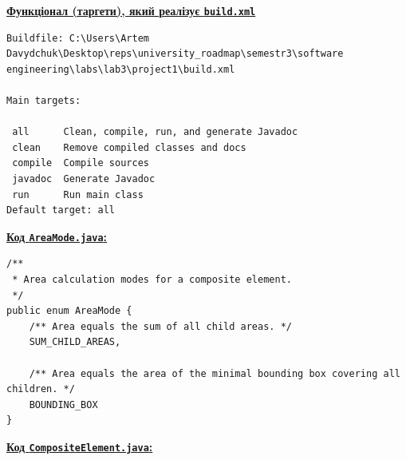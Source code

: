 \documentclass[12pt,a4paper]{article}
\begin{document}
    \textbf{\underline{Функціонал (таргети), який реалізує \texttt{build.xml}}}

    \begin{verbatim}
Buildfile: C:\Users\Artem Davydchuk\Desktop\reps\university_roadmap\semestr3\software engineering\labs\lab3\project1\build.xml

Main targets:

 all      Clean, compile, run, and generate Javadoc
 clean    Remove compiled classes and docs
 compile  Compile sources
 javadoc  Generate Javadoc
 run      Run main class
Default target: all
    \end{verbatim}

    \textbf{\underline{Код \texttt{AreaMode.java}:}}

    \begin{verbatim}
/**
 * Area calculation modes for a composite element.
 */
public enum AreaMode {
    /** Area equals the sum of all child areas. */
    SUM_CHILD_AREAS,

    /** Area equals the area of the minimal bounding box covering all children. */
    BOUNDING_BOX
}
    \end{verbatim}

    \textbf{\underline{Код \texttt{CompositeElement.java}:}}
\end{document}
